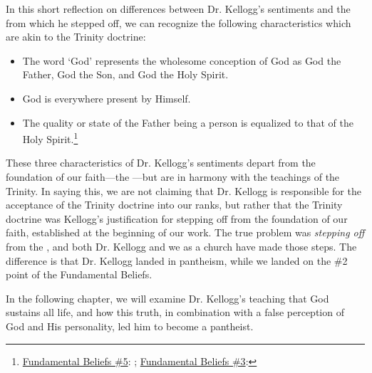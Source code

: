 In this short reflection on differences between Dr. Kellogg's sentiments and the  from which he stepped off, we can recognize the following characteristics which are akin to the Trinity doctrine:

\begin{itemize}
    \item The word ‘God’ represents the wholesome conception of God as God the Father, God the Son, and God the Holy Spirit.
    \item God is everywhere present by Himself.
    \item The quality or state of the Father being a person is equalized to that of the Holy Spirit.\footnote{\href{https://www.adventist.org/wp-content/uploads/2020/06/ADV-28Beliefs2020.pdf}{Fundamental Beliefs \#5}: ; \href{https://www.adventist.org/wp-content/uploads/2020/06/ADV-28Beliefs2020.pdf}{Fundamental Beliefs \#3}: }
\end{itemize}

These three characteristics of Dr. Kellogg's sentiments depart from the foundation of our faith—the —but are in harmony with the teachings of the Trinity. In saying this, we are not claiming that Dr. Kellogg is responsible for the acceptance of the Trinity doctrine into our ranks, but rather that the Trinity doctrine was Kellogg's justification for stepping off from the foundation of our faith, established at the beginning of our work. The true problem was \textit{stepping off} from the , and both Dr. Kellogg and we as a church have made those steps. The difference is that Dr. Kellogg landed in pantheism, while we landed on the \#2 point of the Fundamental Beliefs.

In the following chapter, we will examine Dr. Kellogg's teaching that God sustains all life, and how this truth, in combination with a false perception of God and His personality, led him to become a pantheist.